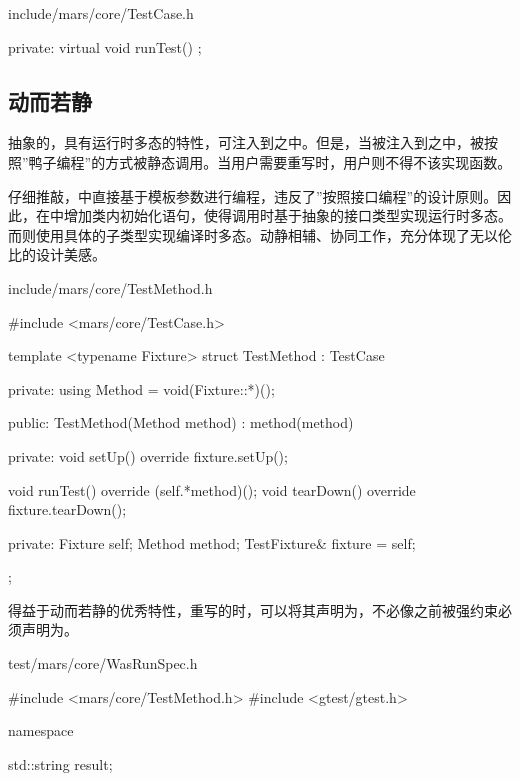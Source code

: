 \begin{content}
\begin{diff}{include/mars/core/TestCase.h}
\begin{minicpp}
{private:
  virtual void runTest() {}
};
  \end{minicpp}
\end{diff}

\subsection{动而若静}

抽象的，具有运行时多态的特性，可注入到之中。但是，当被注入到之中，被按照''鸭子编程''的方式被静态调用。当用户需要重写时，用户则不得不该实现函数。

仔细推敲，中直接基于模板参数进行编程，违反了''按照接口编程''的设计原则。因此，在中增加类内初始化语句，使得调用时基于抽象的接口类型实现运行时多态。而则使用具体的子类型实现编译时多态。动静相辅、协同工作，充分体现了无以伦比的设计美感。

\begin{nodiff}{include/mars/core/TestMethod.h}
 \begin{c++}
#include <mars/core/TestCase.h>

template <typename Fixture>
struct TestMethod : TestCase {
private:
  using Method = void(Fixture::*)();

public:
  TestMethod(Method method)
    : method(method) {}

private:
  void setUp() override {
    fixture.setUp();
  }

  void runTest() override {
    (self.*method)();
  }
  void tearDown() override {
    fixture.tearDown();
  }

private:
  Fixture self;
  Method method;
  TestFixture& fixture = self;
};
  \end{c++}
\end{nodiff}

得益于动而若静的优秀特性，重写的时，可以将其声明为，不必像之前被强约束必须声明为。

\begin{nodiff}{test/mars/core/WasRunSpec.h}
 \begin{c++}
#include <mars/core/TestMethod.h>
#include <gtest/gtest.h>

namespace {
  std::string result;

}
\end{c++}
\end{nodiff}
\end{content}
